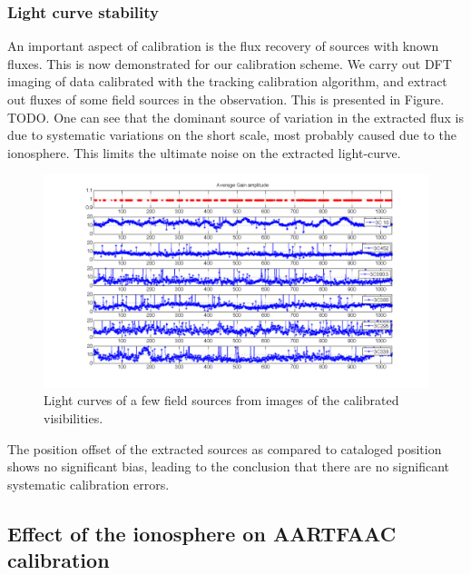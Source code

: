 \documentclass{aa}
\begin{document}
\subsubsection{Light curve stability}

An important aspect of calibration is the flux recovery of sources
with known fluxes. This is now demonstrated for our calibration scheme.
We carry out DFT imaging of data calibrated with the tracking calibration
algorithm, and extract out fluxes of some field sources in the observation.
 This is presented in Figure. TODO. One can see that the dominant
source of variation in the extracted flux is due to systematic variations
on the short scale, most probably caused due to the ionosphere. This
limits the ultimate noise on the extracted light-curve. 

\begin{figure}[tbh]
\includegraphics[width=1\textwidth]{Figs/gain_monlightcurves_newafaac_beam}

\caption{\textcolor{red}{\label{fig:Light-curves-of}}Light curves of a few
field sources from images of the calibrated visibilities.}
\end{figure}
The position offset of the extracted sources as compared to cataloged
position shows no significant bias, leading to the conclusion that
there are no significant systematic calibration errors.


\subsection{\label{sub:iono-effect-on-calib}Effect of the ionosphere on AARTFAAC
calibration}
\end{document}
